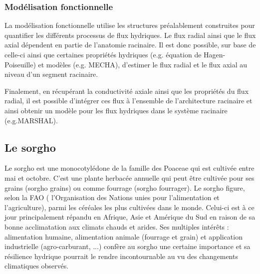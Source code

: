 \subsubsection{Modélisation fonctionnelle}

La modélisation fonctionnelle utilise les structures préalablement construites pour quantifier les différents processus de flux hydriques.
Le flux radial ainsi que le flux axial dépendent en partie de l'anatomie racinaire.
Il est donc possible, sur base de celle-ci ainsi que certaines propriétés hydriques (e.g. équation de Hagen-Poiseuille) et modèles (e.g. MECHA), d'estimer le flux radial et le flux axial au niveau d'un segment racinaire.
\newline

Finalement, en récupérant la conductivité axiale ainsi que les propriétés du flux radial, il est possible d'intégrer ces flux à l'ensemble de l'architecture racinaire et ainsi obtenir un modèle pour les flux hydriques dans le système racinaire (e.g.MARSHAL).

\subsection{Le sorgho}
Le sorgho est une monocotylédone de la famille des Poaceae qui est cultivée entre mai et octobre.
C'est une plante herbacée annuelle qui peut être cultivée pour ses grains (sorgho grains) ou comme fourrage (sorgho fourrager).
Le sorgho figure, selon la FAO ( l'Organisation des Nations unies pour l'alimentation et l'agriculture), parmi les céréales les plus cultivées dans le monde. 
Celui-ci est à ce jour principalement répandu en Afrique, Asie et Amérique du Sud en raison de sa bonne acclimatation aux climats chauds et arides.
Ses multiples intérêts : alimentation humaine, alimentation animale (fourrage et grain) et application industrielle (agro-carburant, ...) confère au sorgho une certaine importance et sa résilience hydrique pourrait le rendre incontournable au vu des changements climatiques observés.
\newline

